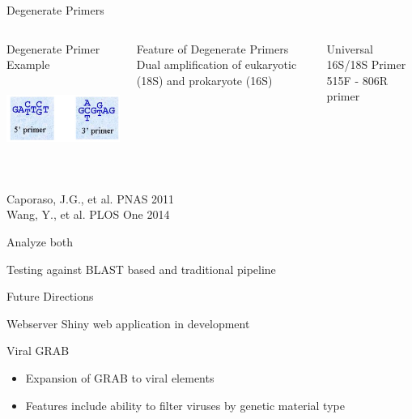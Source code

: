 \documentclass[11pt]{beamer}
\begin{document}
	\begin{frame}{Degenerate Primers}
	\begin{columns}
	
	
	\begin{block}{Degenerate Primer Example}
	\includegraphics[height=3cm, width=5cm]{CPBS_11_18/primers.jpg}
	\end{block}
	\begin{block}{Feature of Degenerate Primers}
	Dual amplification of eukaryotic (18S) and prokaryote (16S)
	\end{block}
	\begin{block}{Universal 16S/18S Primer}
	515F - 806R primer
	\end{block}
	\end{columns}
	\tiny{Caporaso, J.G., et al. PNAS 2011 \\ Wang, Y., et al. PLOS One 2014}

	\end{frame}
	
	\begin{frame}{Analyze both}
	
	\end{frame}
	
	
	\begin{frame}{Testing against BLAST based and traditional pipeline}
	
	\end{frame}
	
	\begin{frame}{Future Directions}
	\begin{block}{Webserver}
	Shiny web application in development
	\end{block}
	
	\begin{block}{Viral GRAB}
	\begin{itemize}
	\item Expansion of GRAB to viral elements
	\item Features include ability to filter viruses by genetic material type
	\end{itemize}
	\end{block}
	\end{frame}
	
\end{document}
